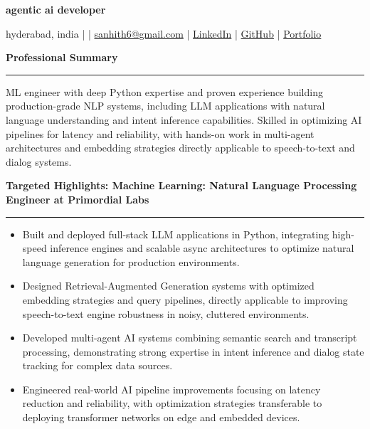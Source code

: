 \documentclass[9pt, letterpaper]{article}
\newcommand{\name}[1]{%
    \begin{center}
        {\LARGE \textbf{#1}}
    \end{center}
}
\newcommand{\sectionheading}[1]{%
    \vspace{4pt}%
    {\large \textbf{#1}}%
    \vspace{1pt}%
    \hrule
    \vspace{2pt}%
}
\begin{document}
\name{agentic ai developer}
\begin{center}
    hyderabad, india \quad |  \quad | \quad
    \href{mailto:sanhith6@gmail.com}{sanhith6@gmail.com} \quad | \quad
    \href{https://www.linkedin.com/in/sanhith-reddy-740a1625b/}{LinkedIn} \quad | \quad
    \href{https://github.com/tsanhith}{GitHub} \quad | \quad
    \href{https://johndoe.dev}{Portfolio}
\end{center}

\vspace{0pt}

\sectionheading{Professional Summary}
ML engineer with deep Python expertise and proven experience building production-grade NLP systems, including LLM applications with natural language understanding and intent inference capabilities. Skilled in optimizing AI pipelines for latency and reliability, with hands-on work in multi-agent architectures and embedding strategies directly applicable to speech-to-text and dialog systems.

\sectionheading{Targeted Highlights: Machine Learning: Natural Language Processing Engineer at Primordial Labs}
\begin{itemize}[leftmargin=0.25in, itemindent=-0.15in, label={--}]
    \item Built and deployed full-stack LLM applications in Python, integrating high-speed inference engines and scalable async architectures to optimize natural language generation for production environments.
    \item Designed Retrieval-Augmented Generation systems with optimized embedding strategies and query pipelines, directly applicable to improving speech-to-text engine robustness in noisy, cluttered environments.
    \item Developed multi-agent AI systems combining semantic search and transcript processing, demonstrating strong expertise in intent inference and dialog state tracking for complex data sources.
    \item Engineered real-world AI pipeline improvements focusing on latency reduction and reliability, with optimization strategies transferable to deploying transformer networks on edge and embedded devices.
\end{itemize}
\end{document}
